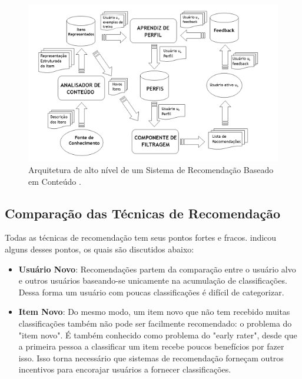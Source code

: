 \begin{figure}
	\centering
	\includegraphics[scale=0.88]{images/high_level_arch_content_based_rec_order.png}
	\caption{Arquitetura de alto nível de um Sistema de Recomendação Baseado em Conteúdo \citep{Lops2011}.}
	\label{fig:high_level_arch_content_based_rec_order}
\end{figure} 


\subsection{Comparação das Técnicas de Recomendação}
\label{subs:compareRecTech}

Todas as técnicas de recomendação tem seus pontos fortes e fracos. \cite{Burke2002} indicou alguns desses pontos, os quais são discutidos abaixo:

\begin{itemize}
	\item{\textbf{Usuário Novo}: Recomendações partem da comparação entre o usuário alvo e outros usuários baseando-se unicamente na acumulação de classificações. Dessa forma um usuário com poucas classificações é difícil de categorizar.}
	
	\item{\textbf{Item Novo}: Do mesmo modo, um item novo que não tem recebido muitas classificações também não pode ser facilmente recomendado: o problema do "item novo". É também conhecido como problema do "early rater", desde que a primeira pessoa a classificar um item recebe poucos benefícios por fazer isso. Isso torna necessário que sistemas de recomendação forneçam outros incentivos para encorajar usuários a fornecer classificações.}
\end{itemize}

